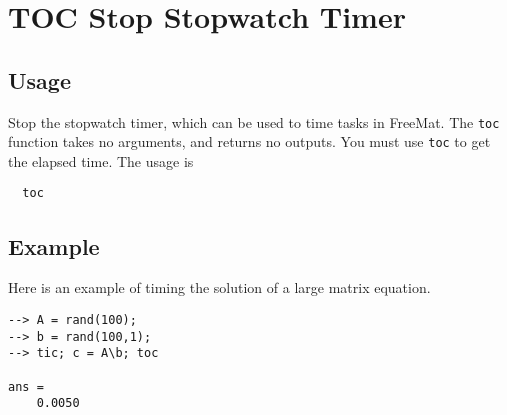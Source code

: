 \section{TOC Stop Stopwatch Timer}

\subsection{Usage}

Stop the stopwatch timer, which can be used to time tasks in FreeMat.
The \verb|toc| function takes no arguments, and returns no outputs.  You must use
\verb|toc| to get the elapsed time.  The usage is
\begin{verbatim}
  toc
\end{verbatim}
\subsection{Example}

Here is an example of timing the solution of a large matrix equation.
\begin{verbatim}
--> A = rand(100);
--> b = rand(100,1);
--> tic; c = A\b; toc

ans = 
    0.0050 
\end{verbatim}
